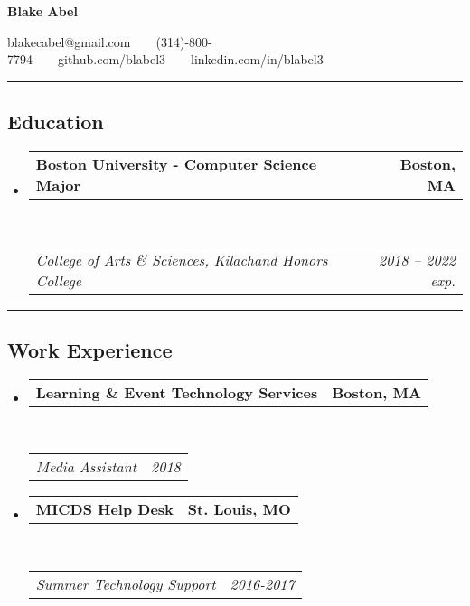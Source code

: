 \documentclass[11pt,letterpaper]{article}
\makeatletter
\newcommand{\headerrow}[2]
{\begin{tabular*}{\linewidth}{l@{\extracolsep{\fill}}r}
	#1 &
	#2 \\
\end{tabular*}}
\makeatother
\begin{document}
\begin{center}
{\LARGE \textbf{Blake Abel}}

blakecabel@gmail.com\ \ \textbullet \ \ (314)-800-7794\ \ \textbullet \ \ github.com/blabel3\ \ \textbullet \ \ linkedin.com/in/blabel3

\end{center}

\hrule
\vspace{-0.4em}
\subsection*{Education}

\begin{itemize}
	\parskip=0.1em

	\item 
	\headerrow
		{\textbf{Boston University - Computer Science Major}}
		{\textbf{Boston, MA}}
	\\
	\headerrow
		{\emph{College of Arts \& Sciences, Kilachand Honors College}}
		{\emph{2018 -- 2022 exp.}}
	

\end{itemize}

\hrule
\vspace{-0.4em}
\subsection*{Work Experience}

\begin{itemize}
	\parskip=0.1em

	\item
	\headerrow
		{\textbf{Learning \& Event Technology Services}}
		{\textbf{Boston, MA}}
	\\
	\headerrow
		{\emph{Media Assistant}}
		{\emph{2018}}

	\item
	\headerrow
		{\textbf{MICDS Help Desk}}
		{\textbf{St. Louis, MO}}
	\\
	\headerrow
		{\emph{Summer Technology Support}}
		{\emph{2016-2017}}

\end{itemize}
\end{document}
